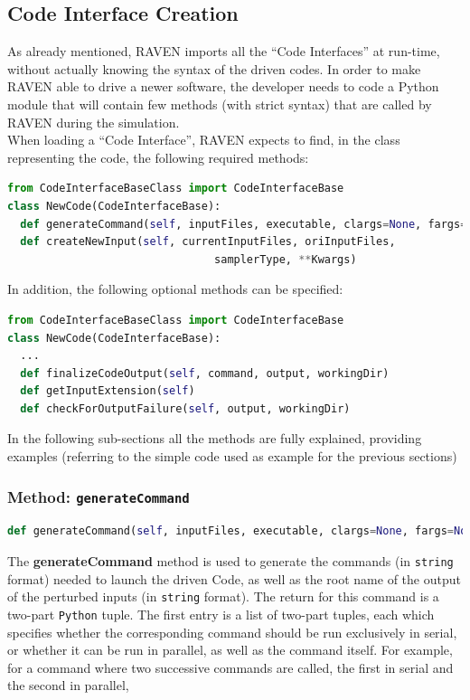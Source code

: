 \subsection{Code Interface Creation}
\label{subsec:codeinterfacecreation}
As already mentioned, RAVEN imports all the ``Code Interfaces'' at run-time,
without actually knowing the syntax of the driven codes. In order to make RAVEN
able to drive a newer software, the developer needs to code a Python module
that will contain few methods (with strict syntax) that are called by RAVEN during the simulation.
\\ When loading a ``Code Interface'', RAVEN expects to find, in the class representing the code,
 the following required methods:
\begin{lstlisting}[language=python]
from CodeInterfaceBaseClass import CodeInterfaceBase
class NewCode(CodeInterfaceBase):
  def generateCommand(self, inputFiles, executable, clargs=None, fargs=None)
  def createNewInput(self, currentInputFiles, oriInputFiles,
                                samplerType, **Kwargs)
\end{lstlisting}
In addition, the following optional methods can be specified:
\begin{lstlisting}[language=python]
from CodeInterfaceBaseClass import CodeInterfaceBase
class NewCode(CodeInterfaceBase):
  ...
  def finalizeCodeOutput(self, command, output, workingDir)
  def getInputExtension(self)
  def checkForOutputFailure(self, output, workingDir)
\end{lstlisting}
In the following sub-sections all the methods are fully explained, providing examples
 (referring to the simple code used as example for the previous sections)
\subsubsection{Method: \texttt{generateCommand}}
\label{subsubsec:generateCommand}
\begin{lstlisting}[language=python]
def generateCommand(self, inputFiles, executable, clargs=None, fargs=None)
\end{lstlisting}
The \textbf{generateCommand} method is used to generate the commands
(in \texttt{string} format) needed to launch the driven Code, as well as the root name of the output of the perturbed inputs (in \texttt{string} format).
The return for this command is a two-part \texttt{Python} tuple.  The first entry is a list of two-part tuples, each
which specifies whether the corresponding command
should be run exclusively in serial, or whether it can be run in parallel, as well as the command itself.
For example, for a command where
two successive commands are called, the first in serial and the second in parallel,

